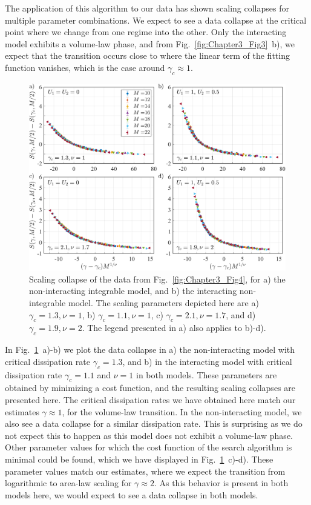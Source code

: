 The application of this algorithm to our data has shown scaling collapses for multiple parameter combinations. We expect to see a data collapse at the critical point where we change from one regime into the other. Only the interacting model exhibits a volume-law phase, and from Fig.~\ref{fig:Chapter3_Fig3}~b), we expect that the transition occurs close to where the linear term of the fitting function vanishes, which is the case around $\gamma_c \approx 1$. 

\begin{figure}[ht]
    \centering
    \includegraphics[width=\textwidth]{Chapters/Plots/Chapter4/Chapter3_Fig5.pdf}
    \caption{Scaling collapse of the data from Fig.~\ref{fig:Chapter3_Fig4}, for a) the non-interacting integrable model, and b) the interacting non-integrable model. The scaling parameters depicted here are a) $\gamma_c = 1.3, \nu = 1$, b) $\gamma_c = 1.1, \nu = 1$, c) $\gamma_c = 2.1, \nu = 1.7$, and d) $\gamma_c = 1.9, \nu = 2$. The legend presented in a) also applies to b)-d).}
    \label{fig:Chapter3_Fig5}
\end{figure}

In Fig.~\ref{fig:Chapter3_Fig5}~a)-b) we plot the data collapse in a) the non-interacting model with critical dissipation rate $\gamma_c = 1.3$, and b) in the interacting model with critical dissipation rate $\gamma_c = 1.1$ and $\nu = 1$ in both models. These parameters are obtained by minimizing a cost function, and the resulting scaling collapses are presented here. The critical dissipation rates we have obtained here match our estimates $\gamma \approx 1$, for the volume-law transition. In the non-interacting model, we also see a data collapse for a similar dissipation rate. This is surprising as we do not expect this to happen as this model does not exhibit a volume-law phase. Other parameter values for which the cost function of the search algorithm is minimal could be found, which we have displayed in Fig.~\ref{fig:Chapter3_Fig5}~c)-d). These parameter values match our estimates, where we expect the transition from logarithmic to area-law scaling for $\gamma \approx 2$. As this behavior is present in both models here, we would expect to see a data collapse in both models. 

